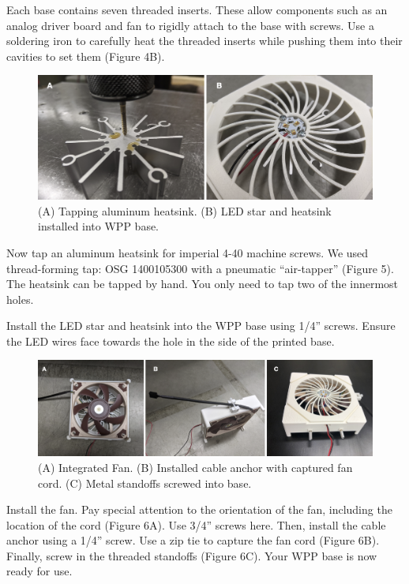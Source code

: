 \documentclass[11pt]{article}
\begin{document}
Each base contains seven threaded inserts.
These allow components such as an analog driver board and fan to rigidly attach to the base with screws.
Use a soldering iron to carefully heat the threaded inserts while pushing them into their cavities to set them (Figure 4B).

\begin{figure}[H]
	\includegraphics[width=\textwidth]{"./fig5.png"}
	\caption{(A) Tapping aluminum heatsink. (B) LED star and heatsink installed into WPP base.}
\end{figure}

Now tap an aluminum heatsink for imperial 4-40 machine screws.
We used thread-forming tap: OSG 1400105300 with a pneumatic ``air-tapper'' (Figure 5).
The heatsink can be tapped by hand.
You only need to tap two of the innermost holes.

Install the LED star and heatsink into the WPP base using 1/4'' screws.
Ensure the LED wires face towards the hole in the side of the printed base.

\begin{figure}[H]
	\includegraphics[width=\textwidth]{"./fig6.png"}
	\caption{(A) Integrated Fan. (B) Installed cable anchor with captured fan cord. (C) Metal standoffs screwed into base.}
\end{figure}

Install the fan.
Pay special attention to the orientation of the fan, including the location of the cord (Figure 6A).
Use 3/4'' screws here.
Then, install the cable anchor using a 1/4'' screw.
Use a zip tie to capture the fan cord (Figure 6B).
Finally, screw in the threaded standoffs (Figure 6C).
Your WPP base is now ready for use.
\end{document}
